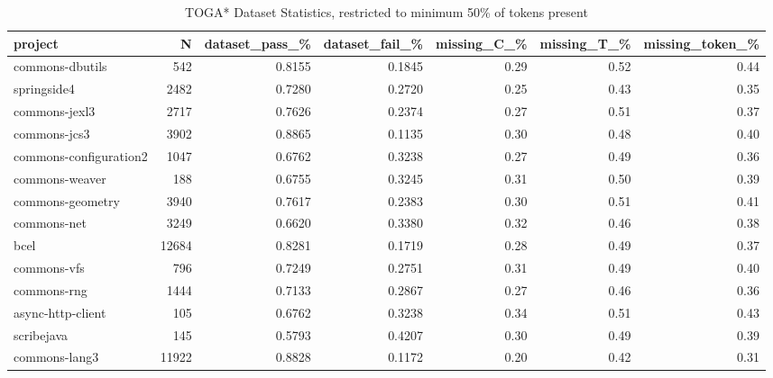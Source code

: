 \begin{table*}
\centering
\caption{TOGA* Dataset Statistics, restricted to minimum 50\% of tokens present}
\label{tab:toga_stats_50}
\begin{tabular}{lrrrrrr}
\toprule
                project &       N &  dataset\_pass\_\% &  dataset\_fail\_\% &  missing\_C\_\% &  missing\_T\_\% &  missing\_token\_\% \\
\midrule
        commons-dbutils &     542 &          0.8155 &          0.1845 &         0.29 &         0.52 &             0.44 \\
            springside4 &    2482 &          0.7280 &          0.2720 &         0.25 &         0.43 &             0.35 \\
          commons-jexl3 &    2717 &          0.7626 &          0.2374 &         0.27 &         0.51 &             0.37 \\
           commons-jcs3 &    3902 &          0.8865 &          0.1135 &         0.30 &         0.48 &             0.40 \\
 commons-configuration2 &    1047 &          0.6762 &          0.3238 &         0.27 &         0.49 &             0.36 \\
         commons-weaver &     188 &          0.6755 &          0.3245 &         0.31 &         0.50 &             0.39 \\
       commons-geometry &    3940 &          0.7617 &          0.2383 &         0.30 &         0.51 &             0.41 \\
            commons-net &    3249 &          0.6620 &          0.3380 &         0.32 &         0.46 &             0.38 \\
                   bcel &   12684 &          0.8281 &          0.1719 &         0.28 &         0.49 &             0.37 \\
            commons-vfs &     796 &          0.7249 &          0.2751 &         0.31 &         0.49 &             0.40 \\
            commons-rng &    1444 &          0.7133 &          0.2867 &         0.27 &         0.46 &             0.36 \\
      async-http-client &     105 &          0.6762 &          0.3238 &         0.34 &         0.51 &             0.43 \\
             scribejava &     145 &          0.5793 &          0.4207 &         0.30 &         0.49 &             0.39 \\
          commons-lang3 &   11922 &          0.8828 &          0.1172 &         0.20 &         0.42 &             0.31 \\

\end{tabular}
\end{table*}
